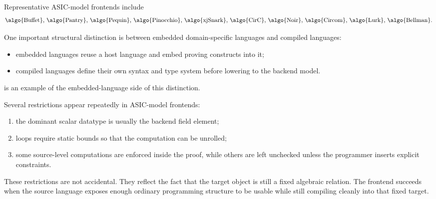 \documentclass[11pt]{article}
\begin{document}
Representative ASIC-model frontends include
\[
  \text{\algo{Buffet}, \algo{Pantry}, \algo{Pequin}, \algo{Pinocchio},
  \algo{xjSnark}, \algo{CirC}, \algo{Noir}, \algo{Circom},
  \algo{Lurk}, \algo{Bellman}}.
\]

One important structural distinction is between embedded domain-specific
languages and compiled languages:
\begin{itemize}
  \item embedded languages reuse a host language and embed proving constructs
        into it;
  \item compiled languages define their own syntax and type system before
        lowering to the backend model.
\end{itemize}

 is an example of the embedded-language side of this distinction.

Several restrictions appear repeatedly in ASIC-model frontends:
\begin{enumerate}
  \item the dominant scalar datatype is usually the backend field element;
  \item loops require static bounds so that the computation can be unrolled;
  \item some source-level computations are enforced inside the proof, while
        others are left unchecked unless the programmer inserts explicit
        constraints.
\end{enumerate}

These restrictions are not accidental.  They reflect the fact that the target
object is still a fixed algebraic relation.  The frontend succeeds when the
source language exposes enough ordinary programming structure to be usable while
still compiling cleanly into that fixed target.
\end{document}
